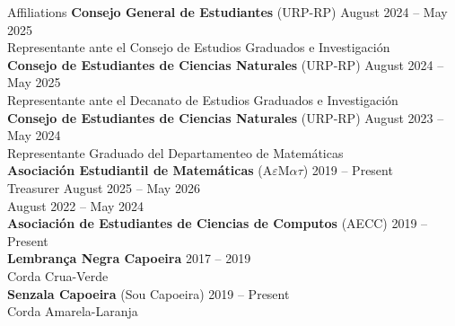 \documentclass{resume}
\begin{document}
\begin{rSection}{Affiliations}
  \textbf{Consejo General de Estudiantes} (URP-RP)
            \hfill August 2024 -- May 2025  \\
  Representante ante el Consejo de Estudios Graduados e
  Investigaci\'on \\

  \textbf{Consejo de Estudiantes de Ciencias Naturales} (URP-RP)
            \hfill August 2024 -- May 2025  \\
  Representante ante el Decanato de Estudios Graduados e
  Investigaci\'on \\

  \textbf{Consejo de Estudiantes de Ciencias Naturales} (URP-RP)
            \hfill August 2023 -- May 2024  \\
  Representante Graduado del Departamenteo de Matem\'aticas \\

  \textbf{Asociaci\'on Estudiantil de Matem\'aticas}
  (A$\varepsilon$M$\alpha\tau$)
            \hfill 2019 -- Present \medskip \\
    Treasurer \hfill August 2025 -- May 2026 \\
    \hspace*{10cm} \hfill August 2022 -- May 2024 \\

  \textbf{Asociaci\'on de Estudiantes de Ciencias de Computos} (AECC)
            \hfill 2019 --  Present \\

  \textbf{Lembran\c{c}a Negra Capoeira} \hfill 2017 -- 2019 \\
  Corda Crua-Verde  \\

  \textbf{Senzala Capoeira} (Sou Capoeira) \hfill 2019 -- Present \\
  Corda Amarela-Laranja  \\

\end{rSection}
\end{document}
